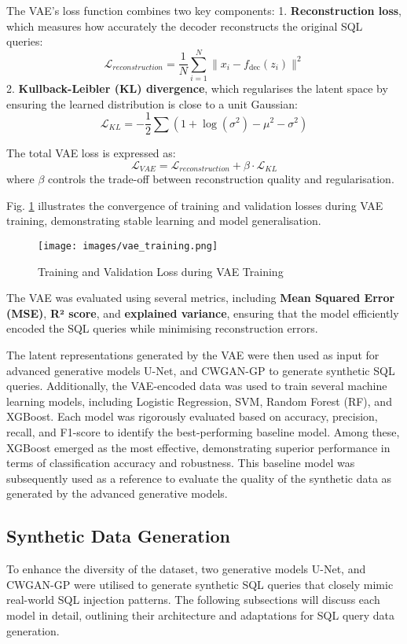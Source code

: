 \documentclass[journal]{IEEEtran}
\begin{document}
The VAE’s loss function combines two key components:
1. \textbf{Reconstruction loss}, which measures how accurately the decoder reconstructs the original SQL queries:
\[
\mathcal{L}_{reconstruction} = \frac{1}{N} \sum_{i=1}^{N} \|x_i - f_{\text{dec}}(z_i)\|^2
\]
2. \textbf{Kullback-Leibler (KL) divergence}, which regularises the latent space by ensuring the learned distribution is close to a unit Gaussian:
\[
\mathcal{L}_{KL} = -\frac{1}{2} \sum (1 + \log(\sigma^2) - \mu^2 - \sigma^2)
\]

The total VAE loss is expressed as:
\[
\mathcal{L}_{VAE} = \mathcal{L}_{reconstruction} + \beta \cdot \mathcal{L}_{KL}
\]
where \(\beta\) controls the trade-off between reconstruction quality and regularisation.

Fig. \ref{fig:vae_training} illustrates the convergence of training and validation losses during VAE training, demonstrating stable learning and model generalisation.

\begin{figure}[H]
    \centering
    \texttt{[image: images/vae\_training.png]}
    \caption{Training and Validation Loss during VAE Training}
    \label{fig:vae_training}
\end{figure}

The VAE was evaluated using several metrics, including \textbf{Mean Squared Error (MSE)}, \textbf{R² score}, and \textbf{explained variance}, ensuring that the model efficiently encoded the SQL queries while minimising reconstruction errors.

The latent representations generated by the VAE were then used as input for advanced generative models U-Net, and CWGAN-GP to generate synthetic SQL queries. Additionally, the VAE-encoded data was used to train several machine learning models, including Logistic Regression, SVM, Random Forest (RF), and XGBoost. Each model was rigorously evaluated based on accuracy, precision, recall, and F1-score to identify the best-performing baseline model. Among these, XGBoost emerged as the most effective, demonstrating superior performance in terms of classification accuracy and robustness. This baseline model was subsequently used as a reference to evaluate the quality of the synthetic data as generated by the advanced generative models.

\subsection{Synthetic Data Generation}
To enhance the diversity of the dataset, two generative models U-Net, and CWGAN-GP were utilised to generate synthetic SQL queries that closely mimic real-world SQL injection patterns. The following subsections will discuss each model in detail, outlining their architecture and adaptations for SQL query data generation.
\end{document}
